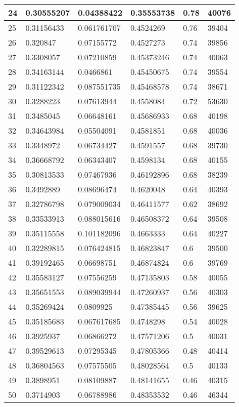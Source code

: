 \begin{longtable}{|l|l|l|l|l|l|}
24 & 0.30555207 & 0.04388422 & 0.35553738 & 0.78 & 40076 \\ \hline 
25 & 0.31156433 & 0.061761707 & 0.4524269 & 0.76 & 39404 \\ \hline 
26 & 0.320847 & 0.07155772 & 0.4527273 & 0.74 & 39856 \\ \hline 
27 & 0.3308057 & 0.07210859 & 0.45373246 & 0.74 & 40063 \\ \hline 
28 & 0.34163144 & 0.0466861 & 0.45450675 & 0.74 & 39554 \\ \hline 
29 & 0.31122342 & 0.087551735 & 0.45468578 & 0.74 & 38671 \\ \hline 
30 & 0.3288223 & 0.07613944 & 0.4558084 & 0.72 & 53630 \\ \hline 
31 & 0.3485045 & 0.06648161 & 0.45686933 & 0.68 & 40198 \\ \hline 
32 & 0.34643984 & 0.05504091 & 0.4581851 & 0.68 & 40036 \\ \hline 
33 & 0.3348972 & 0.06734427 & 0.4591557 & 0.68 & 39730 \\ \hline 
34 & 0.36668792 & 0.06343407 & 0.4598134 & 0.68 & 40155 \\ \hline 
35 & 0.30813533 & 0.07467936 & 0.46192896 & 0.68 & 38239 \\ \hline 
36 & 0.3492889 & 0.08696474 & 0.4620048 & 0.64 & 40393 \\ \hline 
37 & 0.32786798 & 0.079009034 & 0.46411577 & 0.62 & 38692 \\ \hline 
38 & 0.33533913 & 0.088015616 & 0.46508372 & 0.64 & 39508 \\ \hline 
39 & 0.35115558 & 0.101182096 & 0.4663333 & 0.64 & 40227 \\ \hline 
40 & 0.32289815 & 0.076424815 & 0.46823847 & 0.6 & 39500 \\ \hline 
41 & 0.39192465 & 0.06698751 & 0.46874824 & 0.6 & 39769 \\ \hline 
42 & 0.35583127 & 0.07556259 & 0.47135803 & 0.58 & 40055 \\ \hline 
43 & 0.35651553 & 0.089039944 & 0.47260937 & 0.56 & 40303 \\ \hline 
44 & 0.35269424 & 0.0809925 & 0.47385445 & 0.56 & 39625 \\ \hline 
45 & 0.35185683 & 0.067617685 & 0.4748298 & 0.54 & 40028 \\ \hline 
46 & 0.3925937 & 0.06866272 & 0.47571206 & 0.5 & 40031 \\ \hline 
47 & 0.39529613 & 0.07295345 & 0.47805366 & 0.48 & 40414 \\ \hline 
48 & 0.36804563 & 0.07575505 & 0.48028564 & 0.5 & 40133 \\ \hline 
49 & 0.3898951 & 0.08109887 & 0.48141655 & 0.46 & 40315 \\ \hline 
50 & 0.3714903 & 0.06788986 & 0.48353532 & 0.46 & 46344 \\ \hline 
\end{longtable}